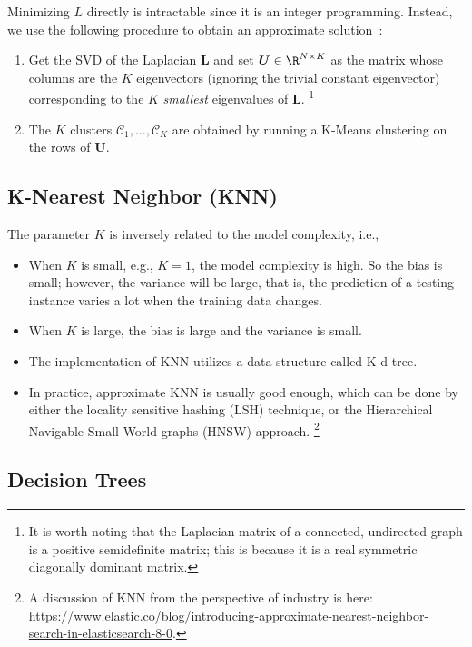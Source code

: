         Minimizing $L$ directly is intractable since it is an integer programming.
        Instead, we use the following procedure to obtain an approximate solution~\cite{shalev2014understanding}:
            \begin{enumerate}
                \item Get the SVD of the Laplacian $\bm{L}$ and set $\bm{U} \in \R^{\ndata \times K}$ as the matrix whose columns are the $K$ eigenvectors (ignoring the trivial constant eigenvector) corresponding to the $K$ \emph{smallest} eigenvalues of $\bm{L}$.
                \footnote{It is worth noting that the Laplacian matrix of a connected, undirected graph is a positive semidefinite matrix; this is because it is a real symmetric diagonally dominant matrix.}
                \item The $K$ clusters $\mathcal{C}_1,\ldots, \mathcal{C}_K$ are obtained by running a K-Means clustering on the rows of $\bm{U}$.
            \end{enumerate}
        
        
\subsection{K-Nearest Neighbor (KNN)}
    The parameter $K$ is inversely related to the model complexity, i.e., 
    \begin{itemize}
        \item When $K$ is small, e.g., $K=1$, the model complexity is high. So the bias is small; however, the variance will be large, that is, the prediction of a testing instance varies a lot when the training data changes. 
        \item When $K$ is large, the bias is large and the variance is small.
        \item The implementation of KNN utilizes a data structure called K-d tree. 
        \item In practice, approximate KNN is usually good enough, which can be done by either the locality sensitive hashing (LSH) technique, or the  Hierarchical Navigable Small World graphs (HNSW) approach.
        \footnote{A discussion of KNN from the perspective of industry is here: \url{https://www.elastic.co/blog/introducing-approximate-nearest-neighbor-search-in-elasticsearch-8-0}.}
    \end{itemize}


\subsection{Decision Trees}
